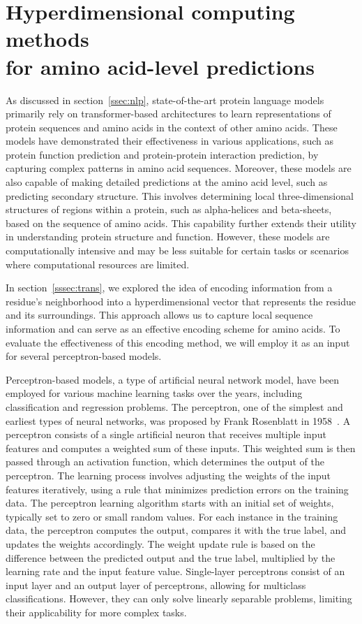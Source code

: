 \chapter{Hyperdimensional computing methods\\for amino acid-level predictions}
As discussed in section~\ref{ssec:nlp}, state-of-the-art protein language models primarily rely on transformer-based architectures to learn representations of protein sequences and amino acids in the context of other amino acids. These models have demonstrated their effectiveness in various applications, such as protein function prediction and protein-protein interaction prediction, by capturing complex patterns in amino acid sequences. Moreover, these models are also capable of making detailed predictions at the amino acid level, such as predicting secondary structure. This involves determining local three-dimensional structures of regions within a protein, such as alpha-helices and beta-sheets, based on the sequence of amino acids. This capability further extends their utility in understanding protein structure and function. However, these models are computationally intensive and may be less suitable for certain tasks or scenarios where computational resources are limited.

In section~\ref{sssec:trans}, we explored the idea of encoding information from a residue's neighborhood into a hyperdimensional vector that represents the residue and its surroundings. This approach allows us to capture local sequence information and can serve as an effective encoding scheme for amino acids. To evaluate the effectiveness of this encoding method, we will employ it as an input for several perceptron-based models.

Perceptron-based models, a type of artificial neural network model, have been employed for various machine learning tasks over the years, including classification and regression problems. The perceptron, one of the simplest and earliest types of neural networks, was proposed by Frank Rosenblatt in 1958~\cite{perceptron}. A perceptron consists of a single artificial neuron that receives multiple input features and computes a weighted sum of these inputs. This weighted sum is then passed through an activation function, which determines the output of the perceptron. The learning process involves adjusting the weights of the input features iteratively, using a rule that minimizes prediction errors on the training data. The perceptron learning algorithm starts with an initial set of weights, typically set to zero or small random values. For each instance in the training data, the perceptron computes the output, compares it with the true label, and updates the weights accordingly. The weight update rule is based on the difference between the predicted output and the true label, multiplied by the learning rate and the input feature value. Single-layer perceptrons consist of an input layer and an output layer of perceptrons, allowing for multiclass classifications. However, they can only solve linearly separable problems, limiting their applicability for more complex tasks.

